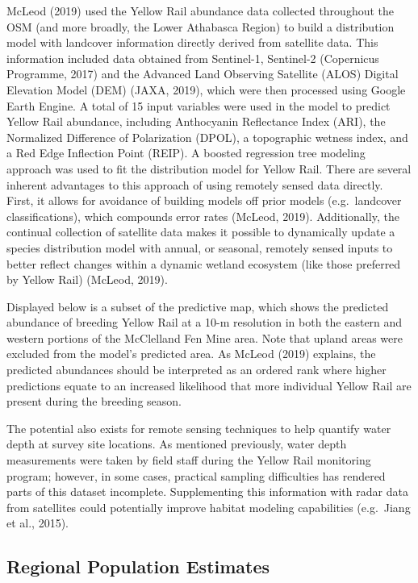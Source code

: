\documentclass[11pt,]{article}
\begin{document}
McLeod (2019) used the Yellow Rail abundance data collected throughout
the OSM (and more broadly, the Lower Athabasca Region) to build a
distribution model with landcover information directly derived from
satellite data. This information included data obtained from Sentinel-1,
Sentinel-2 (Copernicus Programme, 2017) and the Advanced Land Observing
Satellite (ALOS) Digital Elevation Model (DEM) (JAXA, 2019), which were
then processed using Google Earth Engine. A total of 15 input variables
were used in the model to predict Yellow Rail abundance, including
Anthocyanin Reflectance Index (ARI), the Normalized Difference of
Polarization (DPOL), a topographic wetness index, and a Red Edge
Inflection Point (REIP). A boosted regression tree modeling approach was
used to fit the distribution model for Yellow Rail. There are several
inherent advantages to this approach of using remotely sensed data
directly. First, it allows for avoidance of building models off prior
models (e.g.~landcover classifications), which compounds error rates
(McLeod, 2019). Additionally, the continual collection of satellite data
makes it possible to dynamically update a species distribution model
with annual, or seasonal, remotely sensed inputs to better reflect
changes within a dynamic wetland ecosystem (like those preferred by
Yellow Rail) (McLeod, 2019).

Displayed below is a subset of the predictive map, which shows the
predicted abundance of breeding Yellow Rail at a 10-m resolution in both
the eastern and western portions of the McClelland Fen Mine area. Note
that upland areas were excluded from the model's predicted area. As
McLeod (2019) explains, the predicted abundances should be interpreted
as an ordered rank where higher predictions equate to an increased
likelihood that more individual Yellow Rail are present during the
breeding season.

The potential also exists for remote sensing techniques to help quantify
water depth at survey site locations. As mentioned previously, water
depth measurements were taken by field staff during the Yellow Rail
monitoring program; however, in some cases, practical sampling
difficulties has rendered parts of this dataset incomplete.
Supplementing this information with radar data from satellites could
potentially improve habitat modeling capabilities (e.g.~Jiang et al.,
2015).

\subsection{Regional Population
Estimates}\label{regional-population-estimates}
\end{document}
